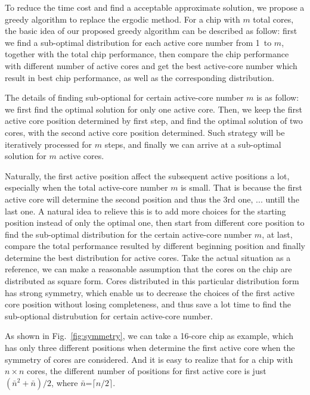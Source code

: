 To reduce the time cost and find a acceptable approximate solution, we propose a greedy algorithm to replace the ergodic method.
For a chip with $m$ total cores, the basic idea of our proposed greedy algorithm can be described as follow: first we find a sub-optimal distribution for each active
core number from \SI{1} to $m$, together with the total chip performance, then compare the chip performance with different number of active cores and get
the best active-core number which result in best chip performance, as well as the corresponding distribution.

The details of finding sub-optional for certain active-core number $m$ is as follow: we first find the optimal solution for only one active core. Then, we keep
the first active core position determined by first step, and find the optimal solution of two cores, with the second active core position determined. Such strategy
will be iteratively processed for $m$ steps, and finally we can arrive at a sub-optimal solution for $m$ active cores.

Naturally, the first active position affect the subsequent active positions a lot, especially when the total active-core
number $m$ is small. That is because the first active core will determine the second position and thus the 3rd one, ...
untill the last one. A natural idea to relieve this is to add more choices for the starting position instead of only the
optimal one, then start from different core position to find the sub-optimal distribution for the certain active-core
number $m$, at last,  compare the total performance resulted by different beginning position and finally determine the
best distribution for active cores.
Take the actual situation as a reference, we can make a reasonable assumption that the cores on the chip are distributed as square form. Cores distributed in
this particular distribution form has strong symmetry, which enable us to decrease the choices of the first active core
position without losing completeness, and thus save a lot time to find the sub-optional distrubution for certain
active-core number.

As shown in Fig.~\ref{fig:symmetry}, we can take a 16-core chip as example, which has only three different positions when determine
the first active core when the symmetry of cores are considered. And it is easy to realize that for a chip with $n
\times n$ cores, the different number of positions for first active core is just $(\bar{n}^2+\bar{n})/2$, where
$\bar{n}$=$\lceil n/2 \rceil$.
